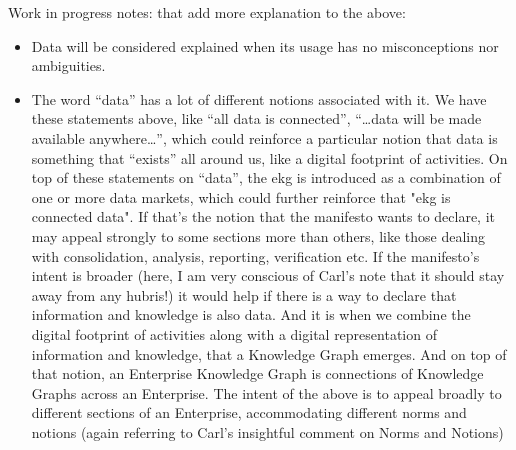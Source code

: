 Work in progress notes: that add more explanation to the above:

\begin{itemize}
    \item Data will be considered explained when its usage has no misconceptions nor ambiguities.
    \item The word “data” has a lot of different notions associated with it.
    We have these statements above, like “all data is connected”, “…data will be made available anywhere…”,
    which could reinforce a particular notion that data is something that “exists” all around us,
    like a digital footprint of activities.
    On top of these statements on “data”, the \gls{ekg} is introduced as a combination of one or more data markets,
    which could further reinforce that "\gls{ekg} is connected data".
    If that’s the notion that the manifesto wants to declare, it may appeal strongly to some sections more than others,
    like those dealing with consolidation, analysis, reporting, verification etc.
    If the manifesto’s intent is broader (here, I am very conscious of Carl’s note that it should stay away
    from any hubris!) it would help if there is a way to declare that information and knowledge is also data.
    And it is when we combine the digital footprint of activities along with a digital representation of
    information and knowledge, that a Knowledge Graph emerges.
    And on top of that notion, an Enterprise Knowledge Graph is connections of Knowledge Graphs across an Enterprise.
    The intent of the above is to appeal broadly to different sections of an Enterprise,
    accommodating different norms and notions (again referring to Carl’s insightful comment on Norms and Notions)

\end{itemize}
